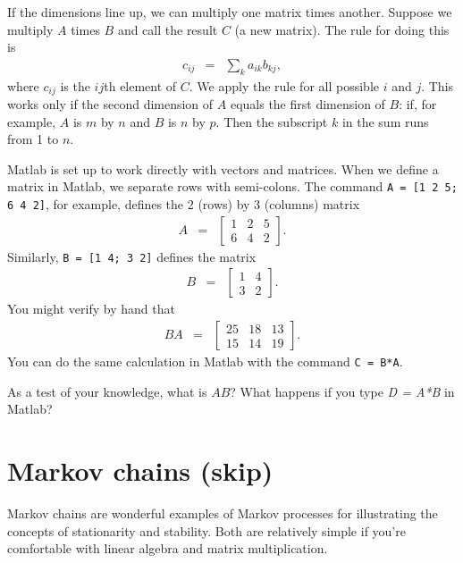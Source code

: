 \documentclass[11pt]{article}
\begin{document}
If the dimensions line up, we can multiply
one matrix times another.
Suppose we multiply $A$ times $B$ and call the result $C$ (a new matrix).
The rule for doing this is
\begin{eqnarray*}
    c_{ij} &=& \sum_k a_{ik} b_{kj} ,
\end{eqnarray*}
where $c_{ij}$ is the $ij$th element of $C$.
We apply the rule for all possible $i$ and $j$.
This works only if the second dimension of $A$ equals the first dimension of $B$:
if, for example, $A$ is $m$ by $n$ and $B$ is $n$ by $p$.
Then the subscript $k$ in the sum runs from 1 to $n$.

Matlab is set up to work directly with vectors and matrices.
When we define a matrix in Matlab, we separate rows with semi-colons.
The command {\tt A = [1 2 5; 6 4 2]}, for example,
defines the 2 (rows) by 3 (columns) matrix
\begin{eqnarray*}
    A &=& \left[
            \begin{array}{ccc}
            1 & 2 & 5 \\ 6 & 4 & 2
            \end{array}
            \right] .
\end{eqnarray*}
Similarly, {\tt B = [1 4; 3 2]} defines the matrix
\begin{eqnarray*}
    B &=& \left[
            \begin{array}{ccc}
            1 & 4 \\  3 & 2
            \end{array}
            \right] .
\end{eqnarray*}
You might verify by hand that
\begin{eqnarray*}
    BA &=& \left[
            \begin{array}{ccc}
            25 & 18 & 13 \\  15 & 14  & 19
            \end{array}
            \right] .
\end{eqnarray*}
You can do the same calculation in Matlab with the command
{\tt C = B*A}.

As a test of your knowledge, what is $A B$?
What happens if you type {\it D = A*B} in Matlab?


\section{Markov chains (skip)}

Markov chains are wonderful examples of Markov processes
for illustrating the concepts of stationarity and stability.
Both are relatively simple if you're comfortable with linear algebra
and matrix multiplication.
\end{document}
